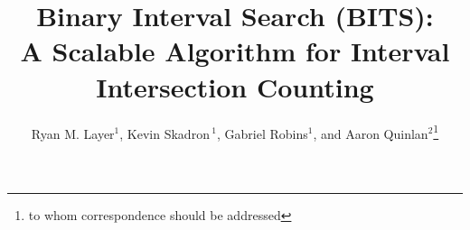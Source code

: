 \documentclass{bioinfo}
\begin{document}

	\title[Optimal Interval Intersection Counting]{
	Binary Interval Search (BITS):  \\
	A Scalable Algorithm for Interval Intersection Counting}

	\author[Sample \textit{et~al}]
	{Ryan M. Layer$^1$, 
	Kevin Skadron\,$^1$,
	Gabriel Robins$^1$, 
	and
	Aaron Quinlan$^2$\footnote{to whom correspondence should be addressed}}
	\address{$^{1}$Department of Computer Science, University of Virginia,
	Charlottesville, VA\\
	$^{2}$Department of Public Health Sciences and Center for Public Health
	Genomics, University of Virginia, Charlottesville, VA}



	\maketitle
\end{document}
